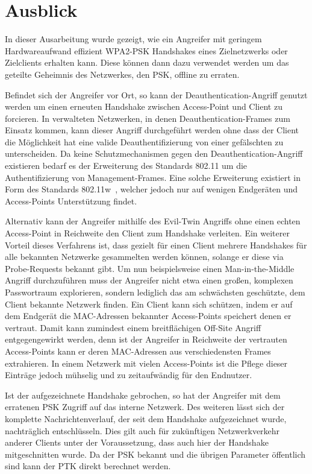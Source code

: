 \section{Ausblick}
In dieser Ausarbeitung wurde gezeigt, wie ein Angreifer mit geringem Hardwareaufwand effizient WPA2-PSK Handshakes eines Zielnetzwerks oder Zielclients erhalten kann. 
Diese können dann dazu verwendet werden um das geteilte Geheimnis des Netzwerkes, den PSK, offline zu erraten.

Befindet sich der Angreifer vor Ort, so kann der Deauthentication-Angriff genutzt werden um einen erneuten Handshake zwischen Access-Point und Client zu forcieren.
In verwalteten Netzwerken, in denen Deauthentication-Frames zum Einsatz kommen, kann dieser Angriff durchgeführt werden ohne dass der Client die Möglichkeit hat eine valide Deauthentifizierung von einer gefälschten zu unterscheiden.
Da keine Schutzmechanismen gegen den Deauthentication-Angriff existieren bedarf es der Erweiterung des Standards 802.11 um die Authentifizierung von Management-Frames. 
Eine solche Erweiterung existiert in Form des Standards 802.11w~\cite{Ahmad:2011:SPS:1998412.1998424}, welcher jedoch nur auf wenigen Endgeräten und Access-Points Unterstützung findet.

Alternativ kann der Angreifer mithilfe des Evil-Twin Angriffs ohne einen echten Access-Point in Reichweite den Client zum Handshake verleiten.
Ein weiterer Vorteil dieses Verfahrens ist, dass gezielt für einen Client mehrere Handshakes für alle bekannten Netzwerke gesammelten werden können, solange er diese via Probe-Requests bekannt gibt.
Um nun beispielsweise einen Man-in-the-Middle Angriff durchzuführen muss der Angreifer nicht etwa einen großen, komplexen Passwortraum explorieren, sondern lediglich das am schwächsten geschützte, dem Client bekannte Netzwerk finden.
Ein Client kann sich schützen, indem er auf dem Endgerät die MAC-Adressen bekannter Access-Points speichert denen er vertraut. 
Damit kann zumindest einem breitflächigen Off-Site Angriff entgegengewirkt werden, denn ist der Angreifer in Reichweite der vertrauten Access-Points kann er deren MAC-Adressen aus verschiedensten Frames extrahieren.
In einem Netzwerk mit vielen Access-Points ist die Pflege dieser Einträge jedoch mühselig und zu zeitaufwändig für den Endnutzer.

Ist der aufgezeichnete Handshake gebrochen, so hat der Angreifer mit dem erratenen PSK Zugriff auf das interne Netzwerk. 
Des weiteren lässt sich der komplette Nachrichtenverlauf, der seit dem Handshake aufgezeichnet wurde, nachträglich entschlüsseln.
Dies gilt auch für zukünftigen Netzwerkverkehr anderer Clients unter der Voraussetzung, dass auch hier der Handshake mitgeschnitten wurde.
Da der PSK bekannt und die übrigen Parameter öffentlich sind kann der PTK direkt berechnet werden.

